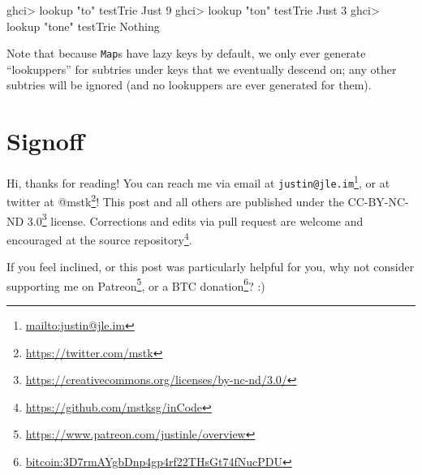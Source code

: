 \documentclass[]{article}
\newenvironment{Shaded}{}{}
\newcommand{\DataTypeTok}[1]{\textcolor[rgb]{0.56,0.13,0.00}{#1}}
\newcommand{\DecValTok}[1]{\textcolor[rgb]{0.25,0.63,0.44}{#1}}
\newcommand{\FunctionTok}[1]{\textcolor[rgb]{0.02,0.16,0.49}{#1}}
\newcommand{\NormalTok}[1]{#1}
\newcommand{\StringTok}[1]{\textcolor[rgb]{0.25,0.44,0.63}{#1}}
\renewcommand{\href}[2]{#2\footnote{\url{#1}}}
\begin{document}
\begin{Shaded}
\begin{Highlighting}[]
\NormalTok{ghci}\FunctionTok{>}\NormalTok{ lookup }\StringTok{"to"}\NormalTok{ testTrie}
\DataTypeTok{Just} \DecValTok{9}
\NormalTok{ghci}\FunctionTok{>}\NormalTok{ lookup }\StringTok{"ton"}\NormalTok{ testTrie}
\DataTypeTok{Just} \DecValTok{3}
\NormalTok{ghci}\FunctionTok{>}\NormalTok{ lookup }\StringTok{"tone"}\NormalTok{ testTrie}
\DataTypeTok{Nothing}
\end{Highlighting}
\end{Shaded}

Note that because \texttt{Map}s have lazy keys by default, we only ever generate
``lookuppers'' for subtries under keys that we eventually descend on; any other
subtries will be ignored (and no lookuppers are ever generated for them).

\hypertarget{signoff}{%
\section{Signoff}\label{signoff}}

Hi, thanks for reading! You can reach me via email at
\href{mailto:justin@jle.im}{\nolinkurl{justin@jle.im}}, or at twitter at
\href{https://twitter.com/mstk}{@mstk}! This post and all others are published
under the \href{https://creativecommons.org/licenses/by-nc-nd/3.0/}{CC-BY-NC-ND
3.0} license. Corrections and edits via pull request are welcome and encouraged
at \href{https://github.com/mstksg/inCode}{the source repository}.

If you feel inclined, or this post was particularly helpful for you, why not
consider \href{https://www.patreon.com/justinle/overview}{supporting me on
Patreon}, or a \href{bitcoin:3D7rmAYgbDnp4gp4rf22THsGt74fNucPDU}{BTC donation}?
:)
\end{document}
